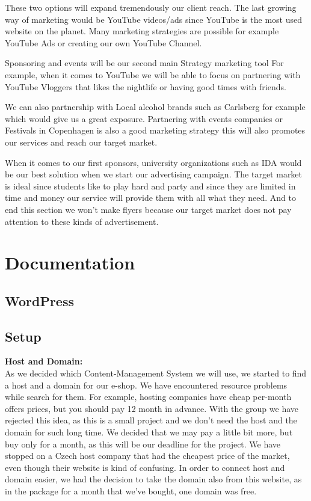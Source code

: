 \documentclass[12p]{article}
\begin{document}
These two options will expand tremendously our client reach.
The last growing way of marketing would be YouTube videos/ads since YouTube is the most used website on the planet.
Many marketing strategies are possible for example YouTube Ads or creating our own YouTube Channel.

Sponsoring and events will be our second main Strategy marketing tool
For example, when it comes to YouTube we will be able to focus on partnering with YouTube Vloggers that likes the nightlife or having good times with friends.

We can also partnership with Local alcohol brands such as Carlsberg for example which would give us a great exposure.
Partnering with events companies or Festivals in Copenhagen is also a good marketing strategy this will also promotes our services and reach our target market.

When it comes to our first sponsors, university organizations such as IDA would be our best solution when we start our advertising campaign.
The target market is ideal since students like to play hard and party and since they are limited in time and money our service will provide them with all what they need. And to end this section we won’t make flyers because our target market does not pay attention to these kinds of advertisement.

\newpage


\newpage
\section{Documentation}

\subsection{WordPress}

\subsection{Setup}
\textbf{Host and Domain:}
\\
As we decided which Content-Management System we will use, we started to find a host and a domain for our e-shop. We have encountered resource problems while search for them. For example, hosting companies have cheap per-month offers prices, but you should pay 12 month in advance. With the group we have rejected this idea, as this is a small project and we don’t need the host and the domain for such long time. We decided that we may pay a little bit more, but buy only for a month, as this will be our deadline for the project. We have stopped on a Czech host company that had the cheapest price of the market, even though their website is kind of confusing. In order to connect host and domain easier, we had the decision to take the domain also from this website, as in the package for a month that we’ve bought, one domain was free. \\
\end{document}
